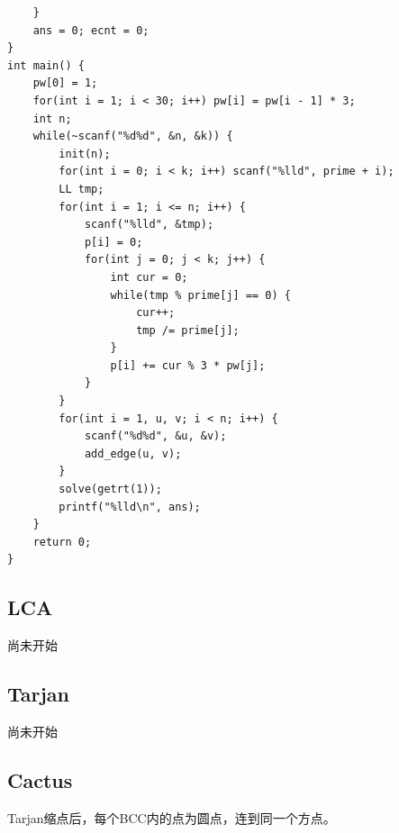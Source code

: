 \documentclass[10pt]{ctexart}
\begin{document}
{\begin{lstlisting}
    }
    ans = 0; ecnt = 0;
}
int main() {
    pw[0] = 1;
    for(int i = 1; i < 30; i++) pw[i] = pw[i - 1] * 3;
    int n;
    while(~scanf("%d%d", &n, &k)) {
        init(n);
        for(int i = 0; i < k; i++) scanf("%lld", prime + i);
        LL tmp;
        for(int i = 1; i <= n; i++) {
            scanf("%lld", &tmp);
            p[i] = 0;
            for(int j = 0; j < k; j++) {
                int cur = 0;
                while(tmp % prime[j] == 0) {
                    cur++;
                    tmp /= prime[j];
                }
                p[i] += cur % 3 * pw[j];
            }
        }
        for(int i = 1, u, v; i < n; i++) {
            scanf("%d%d", &u, &v);
            add_edge(u, v);
        }
        solve(getrt(1));
        printf("%lld\n", ans);
    }
    return 0;
}
\end{lstlisting}

\subsection{LCA}
尚未开始
\subsection{Tarjan}
尚未开始
\subsection{Cactus}
Tarjan缩点后，每个BCC内的点为圆点，连到同一个方点。\\

}
\end{document}
